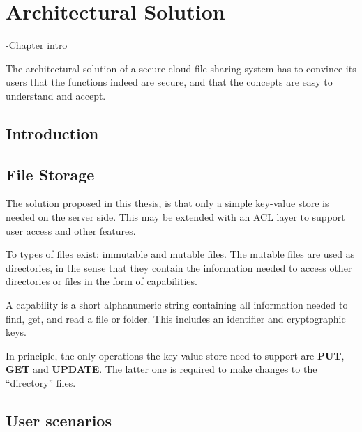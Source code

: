 \documentclass[english,12pt,a4paper]{book}
\begin{document}

\chapter{Architectural Solution}
\label{chap:AS}
-Chapter intro

The architectural solution of a secure cloud file sharing system has to convince
its users that the functions indeed are secure, and that the concepts are easy
to understand and accept.

\section{Introduction}


\section{File Storage}

The solution proposed in this thesis, is that only a simple key-value store is
needed on the server side. This may be extended with an \ac{ACL} layer to
support user access and other features.

To types of files exist: immutable and mutable files. The mutable files are used
as directories, in the sense that they contain the information needed to access
other directories or files in the form of capabilities.

A capability is a short alphanumeric string containing all information needed
to find, get, and read a file or folder. This includes an identifier and
cryptographic keys.

In principle, the only operations the key-value store need to support are
\textbf{PUT}, \textbf{GET} and \textbf{UPDATE}. The latter one is required to
make changes to the ``directory'' files.



\section{User scenarios}
\end{document}
